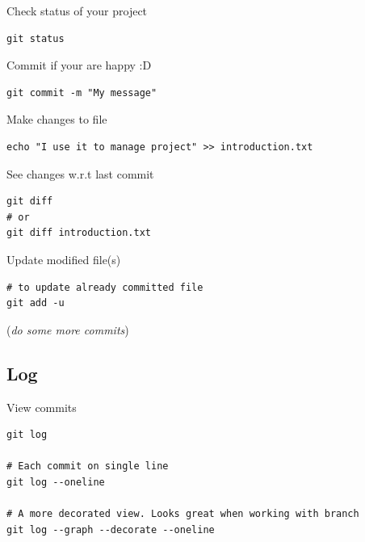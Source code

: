 \documentclass[10pt]{beamer}
\begin{document}
\begin{frame}[fragile,label={sec:orgee60fa0}]{Check status of your project}
 \begin{verbatim}
git status
\end{verbatim}
\end{frame}

\begin{frame}[fragile,label={sec:org3823ffa}]{Commit if your are happy :D}
 \begin{verbatim}
git commit -m "My message"
\end{verbatim}
\end{frame}


\begin{frame}[fragile,label={sec:org3804c9f}]{Make changes to file}
 \begin{verbatim}
echo "I use it to manage project" >> introduction.txt
\end{verbatim}
\end{frame}

\begin{frame}[fragile,label={sec:org4bda706}]{See changes w.r.t last commit}
 \begin{verbatim}
git diff
# or
git diff introduction.txt
\end{verbatim}
\end{frame}


\begin{frame}[fragile,label={sec:org4236b8a}]{Update modified file(s)}
 \begin{verbatim}
# to update already committed file
git add -u
\end{verbatim}

(\emph{do some more commits})
\end{frame}

\subsection{Log}
\label{sec:org06e84c7}
\begin{frame}[fragile,label={sec:org26d365d}]{View commits}
 \begin{verbatim}
git log

# Each commit on single line
git log --oneline

# A more decorated view. Looks great when working with branch
git log --graph --decorate --oneline
\end{verbatim}
\end{frame}
\end{document}
